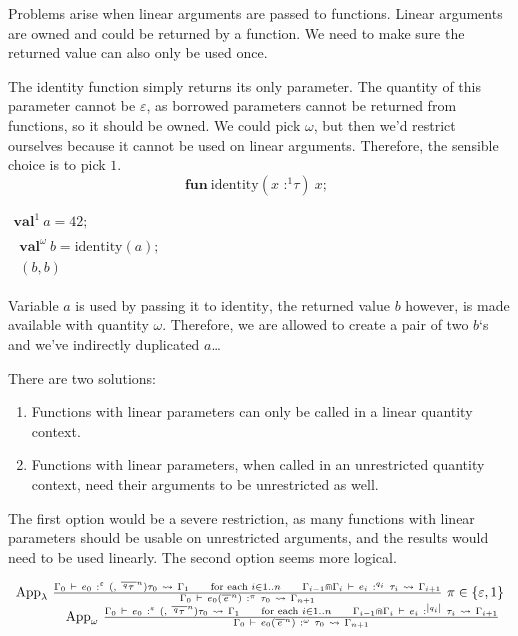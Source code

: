 Problems arise when linear arguments are passed to functions. Linear
arguments are owned and could be returned by a function. We need to make
sure the returned value can also only be used once.

The identity function simply returns its only parameter. The quantity of
this parameter cannot be \(\varepsilon\), as borrowed parameters cannot
be returned from functions, so it should be owned. We could pick
\(\omega\), but then we'd restrict ourselves because it cannot be used
on linear arguments. Therefore, the sensible choice is to pick \(1\).
\[\mathsf{\mathbf{\text{fun}}}\ \text{identity}({x\text{ :}^{1}\tau})\ x;\ \ \]

\(\begin{array}{r}
\mathsf{\mathbf{\text{val}}}^{1}\ a = 42;\  \\
\begin{array}{r}
\mathsf{\mathbf{\text{val}}}^{\omega}\ b = {\text{identity}(a)};\  \\
{(b,b)}
\end{array}
\end{array}\)

Variable \(a\) is used by passing it to \(\text{identity}\), the
returned value \(b\) however, is made available with quantity
\(\omega\). Therefore, we are allowed to create a pair of two \(b\)`s
and we've indirectly duplicated \(a\)\ldots{}

There are two solutions:

\begin{enumerate}
\item
  Functions with linear parameters can only be called in a linear
  quantity context.
\item
  Functions with linear parameters, when called in an unrestricted
  quantity context, need their arguments to be unrestricted as well.
\end{enumerate}

The first option would be a severe restriction, as many functions with
linear parameters should be usable on unrestricted arguments, and the
results would need to be used linearly. The second option seems more
logical.

\[\begin{array}{r}
{\text{App}_{\lambda}\ \frac{{\Gamma_{0}\  \vdash \ e_{0}\ :^{\varepsilon}\ {({,\ }{\overline{\,{{}^{q}\tau}\:}}^{n})\tau_{0}}\  \rightsquigarrow \ \Gamma_{1}}\text{\quad\quad}{\text{for each }i \in 1..n}\text{\quad\quad}{\Gamma_{i - 1} \Cap \Gamma_{i}\  \vdash \ e_{i}\ :^{q_{i}}\ \tau_{i}\  \rightsquigarrow \ \Gamma_{i + 1}}}{\Gamma_{0}\  \vdash \ {e_{0}({\overline{\, e\:}}^{n})}\ :^{\pi}\ \tau_{0}\  \rightsquigarrow \ \Gamma_{n + 1}}\ \pi \in \left\{ \varepsilon,1 \right\}} \\
{\text{App}_{\omega}\ \frac{{\Gamma_{0}\  \vdash \ e_{0}\ :^{\varepsilon}\ {({,\ }{\overline{\,{{}^{q}\tau}\:}}^{n})\tau_{0}}\  \rightsquigarrow \ \Gamma_{1}}\text{\quad\quad}{\text{for each }i \in 1..n}\text{\quad\quad}{\Gamma_{i - 1} \Cap \Gamma_{i}\  \vdash \ e_{i}\ :^{\left| q_{i} \right|}\ \tau_{i}\  \rightsquigarrow \ \Gamma_{i + 1}}}{\Gamma_{0}\  \vdash \ {e_{0}({\overline{\, e\:}}^{n})}\ :^{\omega}\ \tau_{0}\  \rightsquigarrow \ \Gamma_{n + 1}}\ }
\end{array}\]

